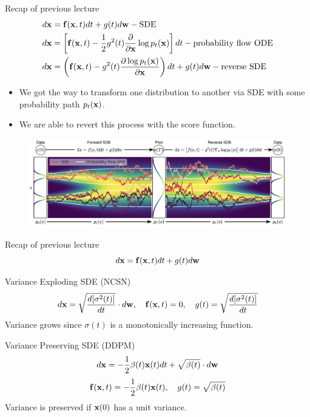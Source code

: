 \begin{frame}{Recap of previous lecture}
	\vspace{-0.5cm}
	\begin{align*}
		d\mathbf{x} &= \mathbf{f}(\mathbf{x}, t) dt + g(t) d \mathbf{w} - \text{SDE} \\
		d\mathbf{x} &= \left[\mathbf{f}(\mathbf{x}, t) -\frac{1}{2} g^2(t) \frac{\partial}{\partial \mathbf{x}} \log p_t(\mathbf{x}) \right] dt - \text{probability flow ODE} \\
		d\mathbf{x} &= \left(\mathbf{f}(\mathbf{x}, t) - g^2(t) \frac{\partial \log p_t(\mathbf{x})}{\partial \mathbf{x}}\right) dt + g(t) d \mathbf{w} - \text{reverse SDE}
	\end{align*}
	\vspace{-0.5cm}
	\begin{itemize}
		\item We got the way to transform one distribution to another via SDE with some probability path $p_t(\mathbf{x})$.
		\item We are able to revert this process with the score function.
	\end{itemize}
	\vspace{-0.3cm}
	\begin{figure}
		\includegraphics[width=0.9\linewidth]{figs/sde}
	\end{figure}
\end{frame}
\begin{frame}{Recap of previous lecture}
	\vspace{-0.3cm}
	\[
		d\mathbf{x} = \mathbf{f}(\mathbf{x}, t) dt + g(t) d \mathbf{w}
	\]
	\vspace{-0.3cm}
	\begin{block}{Variance Exploding SDE (NCSN)}
		\vspace{-0.5cm}
		\[
			d \mathbf{x} = \sqrt{\frac{ d [\sigma^2(t)]}{dt}} \cdot d \mathbf{w}, \quad \mathbf{f}(\mathbf{x}, t) = 0, \quad g(t) = \sqrt{\frac{ d [\sigma^2(t)]}{dt}} 
		\]
		Variance grows since $\sigma(t)$ is a monotonically increasing function.
	\end{block}
	\begin{block}{Variance Preserving SDE (DDPM)}
		\vspace{-0.3cm}
		\[
			d \mathbf{x} = - \frac{1}{2} \beta(t) \mathbf{x}(t) dt + \sqrt{\beta(t)} \cdot d \mathbf{w}
		\]
		\[
			\mathbf{f}(\mathbf{x}, t) = - \frac{1}{2} \beta(t) \mathbf{x}(t) , \quad g(t) = \sqrt{\beta(t)} 
		\]
		Variance is preserved if $\mathbf{x}(0)$ has a unit variance.
	\end{block}
\end{frame}
